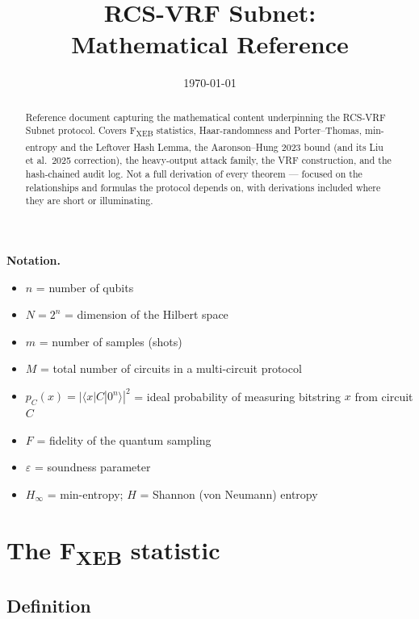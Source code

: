 \documentclass[11pt,a4paper]{article}
\title{\textbf{RCS-VRF Subnet:\\Mathematical Reference}}
\author{}
\date{\today}
\theoremstyle{plain}
\theoremstyle{definition}
\theoremstyle{remark}
\newcommand{\Hmin}{H_{\infty}}
\begin{document}
\maketitle
\thispagestyle{empty}

\begin{abstract}
\noindent Reference document capturing the mathematical content underpinning the RCS-VRF Subnet protocol. Covers F\textsubscript{XEB} statistics, Haar-randomness and Porter--Thomas, min-entropy and the Leftover Hash Lemma, the Aaronson--Hung 2023 bound (and its Liu et al.\ 2025 correction), the heavy-output attack family, the VRF construction, and the hash-chained audit log. Not a full derivation of every theorem --- focused on the relationships and formulas the protocol depends on, with derivations included where they are short or illuminating.
\end{abstract}

\vspace{1em}

\noindent\textbf{Notation.}
\begin{itemize}[itemsep=2pt,topsep=2pt]
  \item $n$ = number of qubits
  \item $N = 2^n$ = dimension of the Hilbert space
  \item $m$ = number of samples (shots)
  \item $M$ = total number of circuits in a multi-circuit protocol
  \item $p_C(x) = |\langle x | C | 0^n \rangle|^2$ = ideal probability of measuring bitstring $x$ from circuit $C$
  \item $F$ = fidelity of the quantum sampling
  \item $\varepsilon$ = soundness parameter
  \item $\Hmin$ = min-entropy; $H$ = Shannon (von Neumann) entropy
\end{itemize}

\tableofcontents
\newpage

\section{The F\textsubscript{XEB} statistic}

\subsection{Definition}
\end{document}
